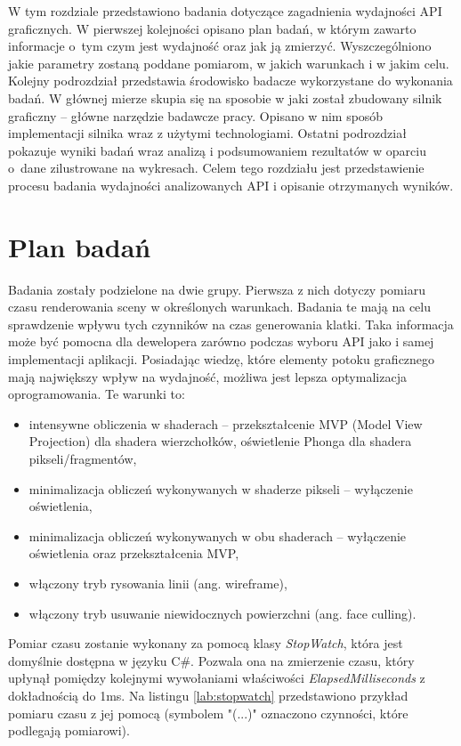 \documentclass[archive]{mgr}
\begin{document}
W tym rozdziale przedstawiono badania dotyczące zagadnienia wydajności API graficznych. W pierwszej kolejności opisano plan badań, w którym zawarto informacje o~tym czym jest wydajność oraz jak ją zmierzyć. Wyszczególniono jakie parametry zostaną poddane pomiarom, w jakich warunkach i w jakim celu. Kolejny podrozdział przedstawia środowisko badacze wykorzystane do wykonania badań. W głównej mierze skupia się na sposobie w jaki został zbudowany silnik graficzny – główne narzędzie badawcze pracy. Opisano w nim sposób implementacji silnika wraz z użytymi technologiami. Ostatni podrozdział pokazuje wyniki badań wraz analizą i podsumowaniem rezultatów w oparciu o~dane zilustrowane na wykresach. Celem tego rozdziału jest przedstawienie procesu badania wydajności analizowanych API i opisanie otrzymanych wyników.


\section{Plan badań}


Badania zostały podzielone na dwie grupy. Pierwsza z nich dotyczy pomiaru czasu renderowania sceny w określonych warunkach. Badania te mają na celu sprawdzenie wpływu tych czynników na czas generowania klatki. Taka informacja może być pomocna dla dewelopera zarówno podczas wyboru API jako i samej implementacji aplikacji. Posiadając wiedzę, które elementy potoku graficznego mają największy wpływ na wydajność, możliwa jest lepsza optymalizacja oprogramowania. Te warunki to:

\begin{itemize}
  \item intensywne obliczenia w shaderach – przekształcenie MVP (Model View Projection) dla shadera wierzchołków, oświetlenie Phonga dla shadera pikseli/fragmentów,
  \item minimalizacja obliczeń wykonywanych w shaderze pikseli – wyłączenie oświetlenia,
  \item minimalizacja obliczeń  wykonywanych w obu shaderach – wyłączenie oświetlenia oraz przekształcenia MVP,
  \item włączony tryb rysowania linii (ang. wireframe),
  \item włączony tryb usuwanie niewidocznych powierzchni (ang. face culling).
\end{itemize}

Pomiar czasu zostanie wykonany za pomocą klasy \emph{StopWatch}, która jest domyślnie dostępna w języku C\#. Pozwala ona na zmierzenie czasu, który upłynął pomiędzy kolejnymi wywołaniami właściwości \emph{ElapsedMilliseconds} z dokładnością do 1ms. Na listingu \ref{lab:stopwatch} przedstawiono przykład pomiaru czasu z jej pomocą (symbolem "(...)" oznaczono czynności, które podlegają pomiarowi).
\end{document}
